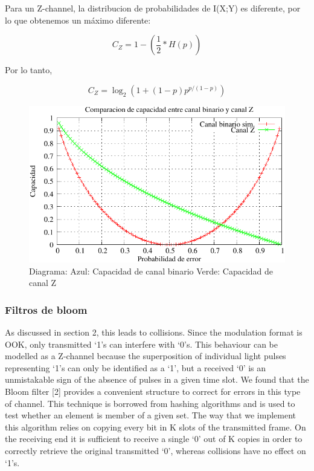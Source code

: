 \documentclass[a4paper,10pt]{report}
\begin{document}
Para un Z-channel, la distribucion de probabilidades de I(X;Y) es diferente, por lo que obtenemos un máximo diferente:

$$ C_{Z} = 1 - \left(\frac{1}{2}*H(p)\right) $$ \cite{tallini}

Por lo tanto,

$$ C_{Z} = \log_2\left(1+(1-p) p^{p/(1-p)}\right) $$


\begin{figure}[th]
  \begin{center}
    \includegraphics[scale=0.9]{capacidad/comparacionBZ}
  \end{center}
  \caption{Diagrama: Azul: Capacidad de canal binario Verde: Capacidad de canal Z}
  \label{fig:CompBZ}
\end{figure}


\subsubsection{Filtros de bloom}
As discussed in section 2, this leads to collisions. Since the modulation format is OOK, only transmitted ‘1’s can interfere with ‘0’s.
This behaviour can be modelled as a Z-channel because the superposition of individual light pulses representing ‘1’s
can only be identified as a ‘1’, but a received ‘0’ is an unmistakable sign of the absence of pulses in a given time slot.
We found that the Bloom filter [2] provides a convenient structure to correct for errors in this type of channel. This
technique is borrowed from hashing algorithms and is used to test whether an element is member of a given set. The
way that we implement this algorithm relies on copying every bit in K slots of the transmitted frame. On the receiving
end it is sufficient to receive a single ‘0’ out of K copies in order to correctly retrieve the original transmitted ‘0’,
whereas collisions have no effect on ‘1’s.
\end{document}
